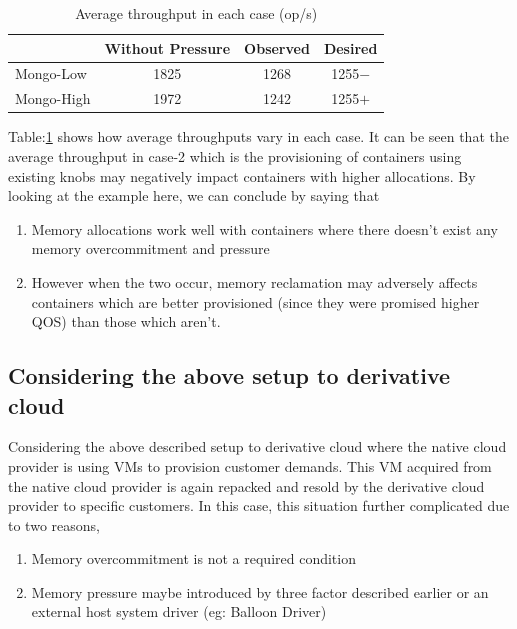	\pagebreak

	\begin{table}
	  \begin{center}
	    \begin{tabular}{ l | c | c | c }	      	    
		  & Without Pressure & Observed & Desired \\ 
	      \hline
	      \hline
	      Mongo-Low  & 1825 & 1268 & 1255$-$ \\  
	      \hline
	      Mongo-High & 1972 & 1242 & 1255$+$ \\
		
	    \end{tabular}
	  \caption{Average throughput in each case (op/s)}
	  \label{table_intro_th}
	  \end{center}	  
	\end{table}
	
	Table:\ref{table_intro_th} shows how average throughputs vary in each case. It can be seen that the average throughput in case-2 
which is the provisioning of containers using existing knobs may negatively impact containers with higher allocations. By looking at the 
example here, we can conclude by saying that 
	
	\begin{enumerate}
	  \item Memory allocations work well with containers where there doesn't exist any memory overcommitment and pressure
	  \item However when the two occur, memory reclamation may adversely affects containers which are better provisioned (since they 
were promised higher QOS) than those which aren't.
	\end{enumerate}
    
    \subsection{Considering the above setup to derivative cloud}
    
      Considering the above described setup to derivative cloud where the native cloud provider is using VMs to provision customer demands. 
This VM acquired from the native cloud provider is again repacked and resold by the derivative cloud provider to specific customers. In 
this case, this situation further complicated due to two reasons,
      
       \begin{enumerate}
	  \item Memory overcommitment is not a required condition
	  \item Memory pressure maybe introduced by three factor described earlier or an external host system driver (eg: Balloon Driver)
       \end{enumerate}

